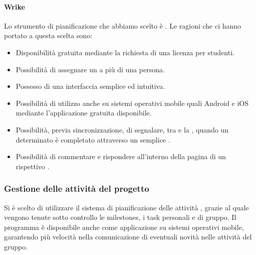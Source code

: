 \paragraph{Wrike}
Lo strumento di pianificazione che abbiamo scelto è .
Le ragioni che ci hanno portato a questa scelta sono:
\begin{itemize}
\item Disponibilità gratuita mediante la richiesta di una licenza per studenti.
\item Possibilità di assegnare un  a più di una persona.
\item Possesso di una interfaccia semplice ed intuitiva.
\item Possibilità di utilizzo anche su sistemi operativi mobile quali Android e iOS mediante l'applicazione gratuita disponibile.
\item Possibilità, previa sincronizzazione, di segnalare, tra  e la  , quando un determinato  è completato attraverso un semplice .
\item Possibilità di commentare e rispondere all'interno della pagina di un rispettivo . 
\end{itemize}

\subsubsection{Gestione delle attività del progetto}
Si è scelto di utilizzare il sistema di pianificazione delle attività , grazie al quale vengono tenute sotto controllo le milestones, i task personali e di gruppo. Il programma  è disponibile anche come applicazione su sistemi operativi mobile, garantendo più velocità nella comunicazione di eventuali novità nelle attività del gruppo.

